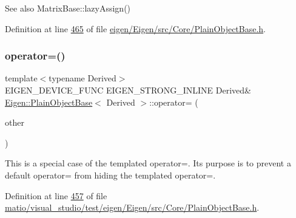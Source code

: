 \begin{DoxySeeAlso}{See also}
Matrix\+Base\+::lazy\+Assign() 
\end{DoxySeeAlso}


Definition at line \hyperlink{eigen_2_eigen_2src_2_core_2_plain_object_base_8h_source_l00465}{465} of file \hyperlink{eigen_2_eigen_2src_2_core_2_plain_object_base_8h_source}{eigen/\+Eigen/src/\+Core/\+Plain\+Object\+Base.\+h}.

\mbox{\label{class_eigen_1_1_plain_object_base_a75308f8a23a03f045a1260611e2054a0}} 
\subsubsection{\texorpdfstring{operator=()}{operator=()}\hspace{0.1cm}{\footnotesize\ttfamily [1/4]}}
{\footnotesize\ttfamily template$<$typename Derived$>$ \\
E\+I\+G\+E\+N\+\_\+\+D\+E\+V\+I\+C\+E\+\_\+\+F\+U\+NC E\+I\+G\+E\+N\+\_\+\+S\+T\+R\+O\+N\+G\+\_\+\+I\+N\+L\+I\+NE Derived\& \hyperlink{class_eigen_1_1_plain_object_base}{Eigen\+::\+Plain\+Object\+Base}$<$ Derived $>$\+::operator= (\begin{DoxyParamCaption}\item[{const \hyperlink{class_eigen_1_1_plain_object_base}{Plain\+Object\+Base}$<$ Derived $>$ \&}]{other }\end{DoxyParamCaption})\hspace{0.3cm}{\ttfamily [inline]}}

This is a special case of the templated operator=. Its purpose is to prevent a default operator= from hiding the templated operator=. 

Definition at line \hyperlink{matio_2visual__studio_2test_2eigen_2_eigen_2src_2_core_2_plain_object_base_8h_source_l00457}{457} of file \hyperlink{matio_2visual__studio_2test_2eigen_2_eigen_2src_2_core_2_plain_object_base_8h_source}{matio/visual\+\_\+studio/test/eigen/\+Eigen/src/\+Core/\+Plain\+Object\+Base.\+h}.

\mbox{\label{class_eigen_1_1_plain_object_base_a75308f8a23a03f045a1260611e2054a0}} 
